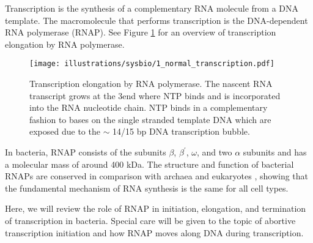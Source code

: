 %
Transcription is the synthesis of a complementary RNA molecule from a DNA
template. The macromolecule that performs transcription is the DNA-dependent
RNA polymerase (RNAP). See Figure \ref{fig:transcription_elongation} for an
overview of transcription elongation by RNA polymerase.

\begin{figure}[htb]
    \begin{center}
        \texttt{[image: illustrations/sysbio/1\_normal\_transcription.pdf]}
    \end{center}
    \caption{Transcription elongation by RNA polymerase. The nascent RNA
    transcript grows at the 3\protect\ppp end where NTP binds and is
    incorporated into the RNA nucleotide chain. NTP binds in a complementary
    fashion to bases on the single stranded template DNA which are exposed due
    to the $\sim$ 14/15 bp DNA transcription bubble.}
    \label{fig:transcription_elongation}
\end{figure}

In bacteria, RNAP consists of the subunits $\beta$, $\beta^{\prime}$, $\omega$,
and two $\alpha$ subunits and has a molecular mass of around 400 kDa. The
structure and function of bacterial RNAPs are conserved in comparison with
archaea and eukaryotes \cite{borukhov_rna_2008}, showing that the fundamental
mechanism of RNA synthesis is the same for all cell types.

Here, we will review the role of RNAP in initiation, elongation, and
termination of transcription in bacteria. Special care will be given to the
topic of abortive transcription initiation and how RNAP moves along DNA during
transcription.

